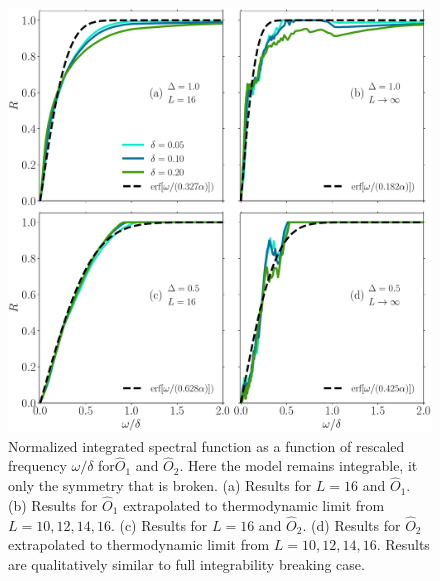 \begin{figure}[htbp]
  \centering
  \includegraphics[width=\figsize\textwidth]{Figures/O12_symmetry_breaking.pdf}
  \caption{Normalized integrated spectral function as a function of rescaled 
  frequency \(\omega/\delta\) for\(\hat{O}_1\) and \(\hat{O}_2\). Here the model remains
  integrable, it only the symmetry that is broken.
  (a) Results for \(L=16\) and \(\hat{O}_1\).  (b) Results for \(\hat{O}_1\) extrapolated to
  thermodynamic limit from \(L=10,12,14,16\). (c) Results for \(L=16\) and \(\hat{O}_2\). 
  (d) Results for \(\hat{O}_2\) extrapolated to thermodynamic limit from \(L=10,12,14,16\).
  Results are qualitatively similar to full integrability breaking case. }\label{fig:O12 symmetry}
\end{figure}
